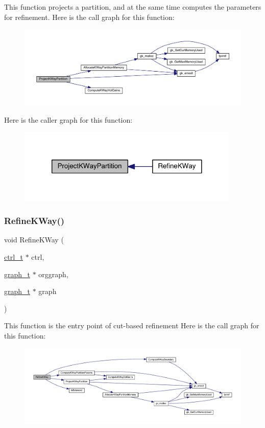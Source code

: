 This function projects a partition, and at the same time computes the parameters for refinement. Here is the call graph for this function\+:\nopagebreak
\begin{figure}[H]
\begin{center}
\leavevmode
\includegraphics[width=350pt]{a00915_a974cb62c010e195c90f8fb900359957c_cgraph}
\end{center}
\end{figure}
Here is the caller graph for this function\+:\nopagebreak
\begin{figure}[H]
\begin{center}
\leavevmode
\includegraphics[width=300pt]{a00915_a974cb62c010e195c90f8fb900359957c_icgraph}
\end{center}
\end{figure}
\mbox{\label{a00915_adeb3fad496482fea745a00c7b39ca7cf}} 
\subsubsection{\texorpdfstring{Refine\+K\+Way()}{RefineKWay()}}
{\footnotesize\ttfamily void Refine\+K\+Way (\begin{DoxyParamCaption}\item[{\hyperlink{a00742}{ctrl\+\_\+t} $\ast$}]{ctrl,  }\item[{\hyperlink{a00734}{graph\+\_\+t} $\ast$}]{orggraph,  }\item[{\hyperlink{a00734}{graph\+\_\+t} $\ast$}]{graph }\end{DoxyParamCaption})}

This function is the entry point of cut-\/based refinement Here is the call graph for this function\+:\nopagebreak
\begin{figure}[H]
\begin{center}
\leavevmode
\includegraphics[width=350pt]{a00915_adeb3fad496482fea745a00c7b39ca7cf_cgraph}
\end{center}
\end{figure}

